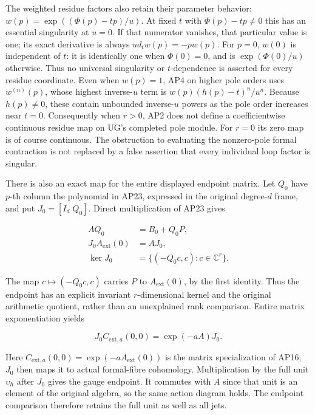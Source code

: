 \documentclass{article}
\begin{document}
The weighted residue factors also retain their parameter behavior: \(w(p)=\exp((\Phi(p)-tp)/u)\). At fixed \(t\) with \(\Phi(p)-tp\ne0\) this has an essential singularity at \(u=0\). If that numerator vanishes, that particular value is one; its exact derivative is always \(u d_t w(p)=-p w(p)\). For \(p=0\), \(w(0)\) is independent of \(t\): it is identically one when \(\Phi(0)=0\), and is \(\exp(\Phi(0)/u)\) otherwise. Thus no universal singularity or \(t\)-dependence is asserted for every residue coordinate. Even when \(w(p)=1\), AP4 on higher pole orders uses \(w^{(n)}(p)\), whose highest inverse-\(u\) term is \(w(p)(h(p)-t)^n/u^n\). Because \(h(p)\ne0\), these contain unbounded inverse-\(u\) powers as the pole order increases near \(t=0\). Consequently when \(r>0\), AP2 does not define a coefficientwise continuous residue map on UG's completed pole module. For \(r=0\) its zero map is of course continuous. The obstruction to evaluating the nonzero-pole formal contraction is not replaced by a false assertion that every individual loop factor is singular.

There is also an exact map for the entire displayed endpoint matrix. Let \(Q_0\) have \(p\)-th column the polynomial in AP23, expressed in the original degree-\(d\) frame, and put \(J_0=[I_d\;Q_0]\). Direct multiplication of AP23 gives

\[
\begin{aligned}
A Q_0&=B_0+Q_0 P,\\
J_0 A_{\mathrm{ext}}(0)&=A J_0,\\
\ker J_0&=\{(-Q_0 c,c):c\in\mathbb C^r\}.
\end{aligned}
\tag{AP25}
\]

The map \(c\mapsto(-Q_0 c,c)\) carries \(P\) to \(A_{\mathrm{ext}}(0)\), by the first identity. Thus the endpoint has an explicit invariant \(r\)-dimensional kernel and the original arithmetic quotient, rather than an unexplained rank comparison. Entire matrix exponentiation yields

\[
J_0 C_{\mathrm{ext},a}(0,0)=\exp(-aA)J_0.
\tag{AP26}
\]

Here \(C_{\mathrm{ext},a}(0,0)=\exp(-a A_{\mathrm{ext}}(0))\) is the matrix specialization of AP16; \(J_0\) then maps it to actual formal-fibre cohomology. Multiplication by the full unit \(\upsilon_h\) after \(J_0\) gives the gauge endpoint. It commutes with \(A\) since that unit is an element of the original algebra, so the same action diagram holds. The endpoint comparison therefore retains the full unit as well as all jets.
\end{document}

